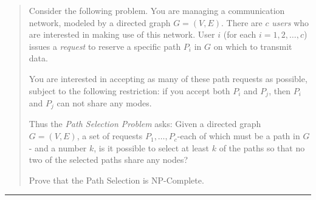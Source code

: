 \documentclass[11pt]{article}
\begin{document}



\begin{quote}

\begin{enumerate}
Consider the following problem. You are managing a communication
network, modeled by a directed graph $G=(V,E)$. There are $c$ {\em
	users} who are interested in making use of this network. User $i$
(for each $i=1,2,\dots ,c$) issues a {\em request} to reserve a
specific path $P_i$ in $G$ on which to transmit data.

You are interested in accepting as many of these path requests as
possible, subject to the following restriction: if you accept both
$P_i$ and $P_j$, then $P_i$ and $P_j$ can not share any modes.

Thus the {\em Path Selection Problem} asks: Given a directed graph
$G=(V,E)$, a set of requests $P_1,\dots,P_c$-each of which must be a
path in $G$- and a number $k$, is it possible to select at least $k$
of the paths so that no two of the selected paths share any nodes?

Prove that the Path Selection is NP-Complete.

\end{enumerate}

\end{quote}
\hrule
\end{document}
